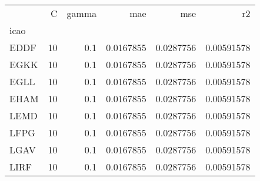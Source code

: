 \begin{tabular}{lrrrrr}
\toprule
{} &   C & gamma &        mae &        mse &          r2 \\
icao &     &       &            &            &             \\
\midrule
EDDF &  10 &   0.1 &  0.0167855 &  0.0287756 &  0.00591578 \\
EGKK &  10 &   0.1 &  0.0167855 &  0.0287756 &  0.00591578 \\
EGLL &  10 &   0.1 &  0.0167855 &  0.0287756 &  0.00591578 \\
EHAM &  10 &   0.1 &  0.0167855 &  0.0287756 &  0.00591578 \\
LEMD &  10 &   0.1 &  0.0167855 &  0.0287756 &  0.00591578 \\
LFPG &  10 &   0.1 &  0.0167855 &  0.0287756 &  0.00591578 \\
LGAV &  10 &   0.1 &  0.0167855 &  0.0287756 &  0.00591578 \\
LIRF &  10 &   0.1 &  0.0167855 &  0.0287756 &  0.00591578 \\
\bottomrule
\end{tabular}

